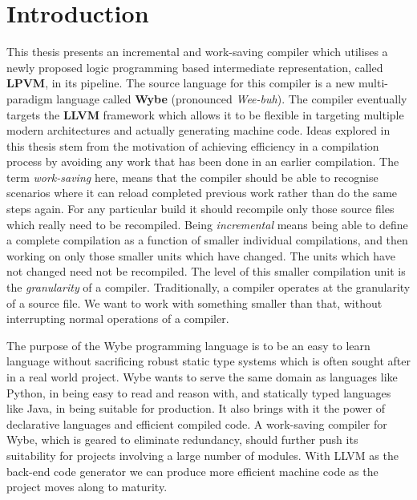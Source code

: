 \chapter{Introduction}

This thesis presents an incremental and work-saving compiler which utilises a
newly proposed logic programming based intermediate representation, called
\textbf{LPVM}, in its pipeline. The source language for this compiler is a new
multi-paradigm language called \textbf{Wybe} (pronounced \textit{Wee-buh}). The
compiler eventually targets the \textbf{LLVM} framework which allows it to be
flexible in targeting multiple modern architectures and actually generating
machine code. Ideas explored in this thesis stem from the motivation of
achieving efficiency in a compilation process by avoiding any work that has
been done in an earlier compilation. The term \textit{work-saving} here, means
that the compiler should be able to recognise scenarios where it can reload
completed previous work rather than do the same steps again. For any particular
build it should recompile only those source files which really need to be
recompiled. Being \textit{incremental} means being able to define a complete
compilation as a function of smaller individual compilations, and then working
on only those smaller units which have changed. The units which have not
changed need not be recompiled. The level of this smaller compilation unit is
the \textit{granularity} of a compiler. Traditionally, a compiler operates at
the granularity of a source file. We want to work with something smaller than
that, without interrupting normal operations of a compiler.

The purpose of the Wybe programming language is to be an easy to learn language
without sacrificing robust static type systems which is often sought after in a
real world project. Wybe wants to serve the same domain as languages like
Python, in being easy to read and reason with, and statically typed languages
like Java, in being suitable for production. It also brings with it the power
of declarative languages and efficient compiled code. A work-saving compiler
for Wybe, which is geared to eliminate redundancy, should further push its
suitability for projects involving a large number of modules. With LLVM as the
back-end code generator we can produce more efficient machine code as the
project moves along to maturity.


